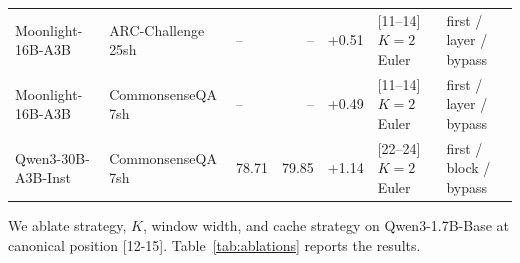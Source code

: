 \begin{table}[h]
{\begin{tabular}{lllrrll}
Moonlight-16B-A3B  & ARC-Challenge 25sh& --    & --    & +0.51 & [11--14] $K{=}2$ Euler  & first / layer / bypass \\
Moonlight-16B-A3B  & CommonsenseQA 7sh & --    & --    & +0.49 & [11--14] $K{=}2$ Euler  & first / layer / bypass \\
\midrule
Qwen3-30B-A3B-Inst & CommonsenseQA 7sh & 78.71 & 79.85 & +1.14 & [22--24] $K{=}2$ Euler  & first / block / bypass \\
\bottomrule
\end{tabular}%
}
\end{table}

We ablate strategy, $K$, window width, and cache strategy on Qwen3-1.7B-Base at canonical position [12-15]. Table~\ref{tab:ablations} reports the results.

\begin{table}[h]
\centering
\caption{Ablations of the loop wrapper on Qwen3-1.7B-Base \texttt{[12--15]}. $\Delta$pp on the $16$-task macro vs.\ the no-loop baseline; the within-family reference cell is damped Euler at $K{=}2,\,\alpha{=}0.5$. $\downarrow\downarrow$ marks catastrophic divergence (perplexity blowup or strict-format regression). Bold marks the per-axis best.}
\label{tab:ablations}
\small
\renewcommand{\arraystretch}{1.15}
\setlength{\tabcolsep}{5pt}
\end{table}
